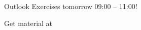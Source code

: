 \begin{frame}{Outlook}{\relax}
	{\Large Exercises tomorrow 09:00 -- 11:00!}
	
	\bigskip
	Get material at 
\end{frame}